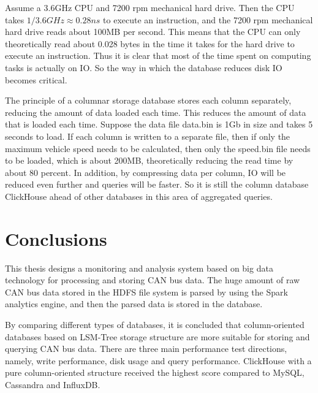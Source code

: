 Assume a 3.6GHz CPU and 7200 rpm mechanical hard drive. Then the CPU takes $ 1/3.6GHz \approx 0.28ns $ to execute an instruction, and the 7200 rpm mechanical hard drive reads about 100MB per second. This means that the CPU can only theoretically read about 0.028 bytes in the time it takes for the hard drive to execute an instruction. Thus it is clear that most of the time spent on computing tasks is actually on IO. So the way in which the database reduces disk IO becomes critical.

The principle of a columnar storage database stores each column separately, reducing the amount of data loaded each time. This reduces the amount of data that is loaded each time. Suppose the data file data.bin is 1Gb in size and takes 5 seconds to load. If each column is written to a separate file, then if only the maximum vehicle speed needs to be calculated, then only the speed.bin file needs to be loaded, which is about 200MB, theoretically reducing the read time by about 80 percent. In addition, by compressing data per column, IO will be reduced even further and queries will be faster. So it is still the column database ClickHouse ahead of other databases in this area of aggregated queries.

\chapter{Conclusions}
\label{ch:closure}

This thesis designs a monitoring and analysis system based on big data technology for processing and storing CAN bus data. The huge amount of raw CAN bus data stored in the HDFS file system is parsed by using the Spark analytics engine, and then the parsed data is stored in the database.

By comparing different types of databases, it is concluded that column-oriented databases based on LSM-Tree storage structure are more suitable for storing and querying CAN bus data. There are three main performance test directions, namely, write performance, disk usage and query performance. ClickHouse with a pure column-oriented structure received the highest score compared to MySQL, Cassandra and InfluxDB.

